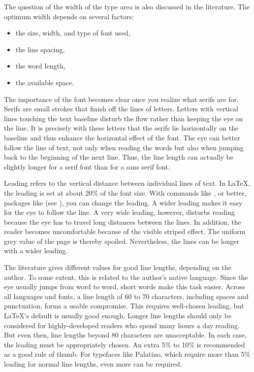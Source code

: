 \begin{Explain}
  The question of the width of the type area is also discussed in the
  literature. The optimum width depends on several factors:
  \begin{itemize}
  \item the size, width, and type of font used,
  \item the line spacing,
  \item the word length,
  \item the available space.
  \end{itemize}
  The importance of the font becomes clear once you realize what serifs are
  for. Serifs are small strokes that finish off the
  lines of letters. Letters with vertical lines touching the text baseline
  disturb the flow rather than keeping the eye on the line. It is precisely
  with these letters that the serifs lie horizontally on the baseline and thus
  enhance the horizontal effect of the font. The eye can better follow the
  line of text, not only when reading the words but also when jumping back to
  the beginning of the next line. Thus, the line length can actually be
  slightly longer for a serif font than for a sans serif font.

  Leading refers to the vertical
  distance between individual lines of text. In \LaTeX{}, the leading is set
  at about 20\% of the font size. With commands like
  , or better, packages like
   (see \cite{package:setspace}), you
  can change the leading. A wider leading makes it easy for the eye to follow
  the line. A very wide leading, however, disturbs reading because the eye has
  to travel long distances between the lines. In addition, the reader becomes
  uncomfortable because of the visible striped effect. The uniform grey value
  of the page is thereby spoiled. Nevertheless, the lines can be longer with a
  wider leading.

  The literature gives different values for good line
  lengths, depending on the author. To some
  extent, this is related to the author's native language. Since the eye
  usually jumps from word to word, short words make this task easier. Across
  all languages and fonts, a line length of 60 to 70 characters, including
  spaces and punctuation, forms a usable compromise. This requires well-chosen
  leading, but {\LaTeX}'s default is usually good enough. Longer line lengths
  should only be considered for highly-developed readers who spend many hours
  a day reading. But even then, line lengths beyond 80 characters are
  unacceptable. In each case, the leading must be appropriately chosen. An
  extra 5\% to 10\% is recommended as a good rule of thumb. For typefaces like
  Palatino, which require more than 5\% leading for normal line lengths, even
  more can be required.


\end{Explain}
